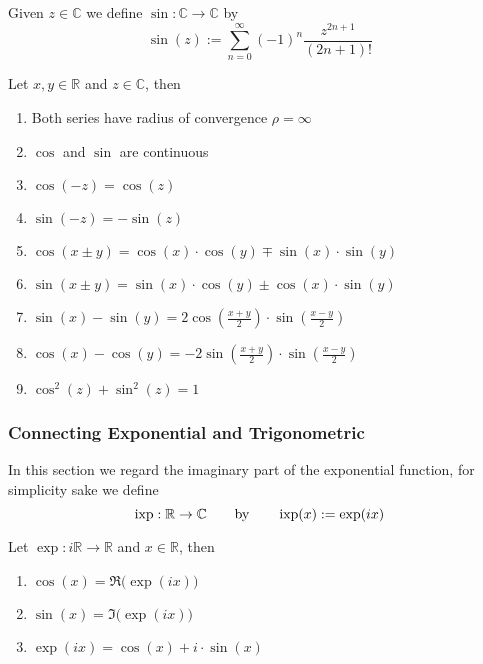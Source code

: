 \begin{definition}[Sine]
   Given \(z \in \mathbb{C}\) we define \(\sin: \mathbb{C} \to \mathbb{C}\) by
   \[\sin(z) := \sum_{n=0}^\infty (-1)^n \frac{z^{2n + 1}}{(2n+1)!}\]
\end{definition}

\begin{proposition}[Properties]
   Let \(x, y \in \mathbb{R}\) and \(z \in \mathbb{C}\), then
   \begin{enumerate}[label=\roman*, align=Center]
      \item Both series have radius of convergence \(\rho = \infty\)
      \item \(\cos\) and \(\sin\) are continuous
      \item \(\cos(-z) = \cos(z)\)
      \item \(\sin(-z) = -\sin(z)\)
      \item \(\cos(x \pm y) = \cos(x) \cdot \cos(y) \mp \sin(x) \cdot \sin(y)\)
      \item \(\sin(x \pm y) = \sin(x) \cdot \cos(y) \pm \cos(x) \cdot \sin(y)\)
      \item \(\sin(x) - \sin(y) = 2 \cos\left(\frac{x+y}{2}\right) \cdot \sin\left(\frac{x-y}{2}\right)\)
      \item \(\cos(x) - \cos(y) = -2 \sin\left(\frac{x+y}{2}\right) \cdot \sin\left(\frac{x-y}{2}\right)\)
      \item \(\cos^2(z) + \sin^2(z) = 1\)
   \end{enumerate}
\end{proposition}

\subsubsection{Connecting Exponential and Trigonometric}
In this section we regard the imaginary part of the exponential function, for simplicity sake we define
\[\operatorname{ixp}: \mathbb{R} \to \mathbb{C} \qquad\text{by}\qquad \operatorname{ixp}(x) := \exp(ix)\]

\begin{proposition}
   Let \(\exp: i\mathbb{R} \to \mathbb{R}\) and \(x \in \mathbb{R}\), then
   \begin{enumerate}[label=\roman*, align=Center]
      \item \(\cos(x) = \Re\big(\exp(ix)\big)\)
      \item \(\sin(x) = \Im\big(\exp(ix)\big)\)
      \item \(\exp(ix) = \cos(x) + i \cdot \sin(x)\)
   \end{enumerate}
\end{proposition}

